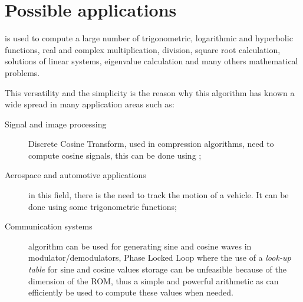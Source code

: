 \section{Possible applications}\label{sec:applications}

\cordic{} is used to compute a large number of trigonometric, logarithmic and
hyperbolic functions, real and complex multiplication, division, square root
calculation, solutions of linear systems, eigenvalue calculation and many others
mathematical problems.

This versatility and the simplicity is the reason why this algorithm has known a
wide spread in many application areas such as:
\begin{description}
	\item [Signal and image processing] Discrete Cosine Transform, used in
		compression algorithms, need to compute cosine signals, this can
		be done using \cordic{};
	\item[Aerospace and automotive applications] in this field, there is the
		need to track the motion of a vehicle. It can be done using some
		trigonometric functions;
	\item[Communication systems] \cordic{} algorithm can be used for
		generating sine and cosine waves in modulator/demodulators,
		Phase Locked Loop where the use of a \emph{look-up table} for
		sine and cosine values storage can be unfeasible because of the
		dimension of the ROM, thus a simple and powerful arithmetic as
		\cordic{} can efficiently be used to compute these values when
		needed.
\end{description}
